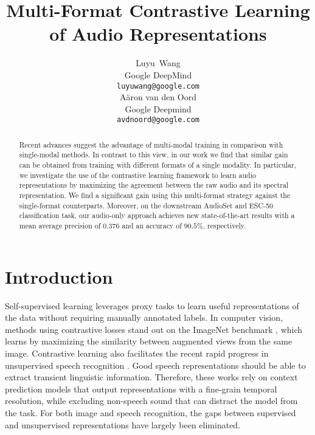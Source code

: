 \documentclass{article}
\title{Multi-Format Contrastive Learning of Audio Representations}
\author{Luyu~Wang \\
  Google DeepMind\\
\texttt{luyuwang@google.com} \\
\And
  A\"aron van den Oord \\
  Google Deepmind \\
\texttt{avdnoord@google.com} \\
}
\begin{document}
\maketitle

\begin{abstract}
  Recent advances suggest the advantage of multi-modal training in comparison with single-modal methods. In contrast to this view, in our work we find that similar gain can be obtained from training with different formats of a single modality. In particular, we investigate the use of the contrastive learning framework to learn audio representations by maximizing the agreement between the raw audio and its spectral representation. We find a significant gain using this multi-format strategy against the single-format counterparts. Moreover, on the downstream AudioSet and ESC-50 classification task, our audio-only approach achieves new state-of-the-art results with a mean average precision of 0.376 and an accuracy of $90.5\%$, respectively.
\end{abstract}

\section{Introduction}

Self-supervised learning leverages proxy tasks to learn useful representations of the data without requiring manually annotated labels. In computer vision, methods using contrastive losses \cite{hjelm2018learning, oord2018representation, bachman2019learning, henaff2020data, he2020momentum, chen2020simple, chen2020big} stand out on the ImageNet benchmark \cite{deng2009imagenet}, which learns by maximizing the similarity between augmented views from the same image. Contrastive learning also facilitates the recent rapid progress in unsupervised speech recognition \cite{schneider2019wav2vec, baevski2019vq, kawakami2020learning, riviere2020unsupervised, kahn2020libri, baevski2020wav2vec}. Good speech representations should be able to extract transient linguistic information. Therefore, these works rely on context prediction models that output representations with a fine-grain temporal resolution, while excluding non-speech sound that can distract the model from the task. For both image and speech recognition, the gaps between supervised and unsupervised representations have largely been eliminated.
\end{document}
